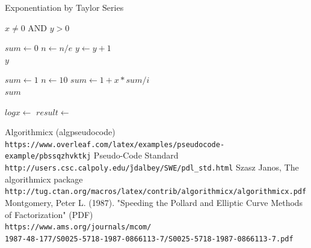 \documentclass[a4paper, 11pt]{report}
\begin{document}
\begin{algorithm}
\caption{Exponentiation by Taylor Series}\label{exp1}
\begin{algorithmic}[1]
\Require $x \neq 0$ AND $y > 0$

\State $sum\gets 0$
    \State $n\gets n/e$
    \State $y \gets y+1 $
\EndWhile \\
\Return $y$
\EndFunction

\State $sum\gets 1$
\State $n\gets 10$
\State $sum\gets 1+ x * sum / i$
\EndFor \\
\Return $sum$
\EndFunction

\State $logx \gets $
\State $result \gets $
\end{algorithmic}
\end{algorithm}

\begin{thebibliography}{}
Algorithmicx (algpseudocode)
\\\texttt{https://www.overleaf.com/latex/examples/pseudocode-example/pbssqzhvktkj}
Pseudo-Code Standard
\\\texttt{http://users.csc.calpoly.edu/\~jdalbey/SWE/pdl\_std.html}
Szasz Janos, The algorithmicx package
\\\texttt{http://tug.ctan.org/macros/latex/contrib/algorithmicx/algorithmicx.pdf}
 Montgomery, Peter L. (1987). "Speeding the Pollard and Elliptic Curve Methods of Factorization" (PDF)
\\\texttt{https://www.ams.org/journals/mcom/\\1987-48-177/S0025-5718-1987-0866113-7/S0025-5718-1987-0866113-7.pdf}
\end{thebibliography}
\end{document}
